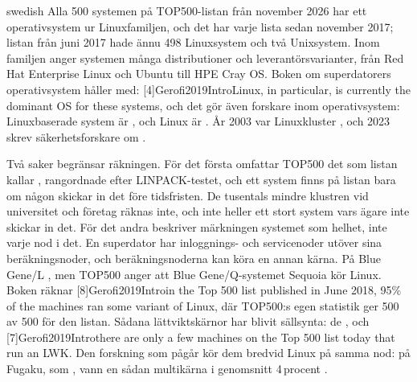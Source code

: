 \begin{onlyin}{swedish}
Alla 500 systemen på TOP500-listan från november 2026 har ett
operativsystem ur Linuxfamiljen, och det har varje lista sedan november
2017; listan från juni 2017 hade ännu 498 Linuxsystem och två
Unixsystem\autocite{Top500OSFamily2026}.  Inom familjen anger systemen
många distributioner och leverantörsvarianter, från Red Hat Enterprise
Linux och Ubuntu till HPE Cray OS\autocite{Top500OS2026}.  Boken om
superdatorers operativsystem håller med:
[4]{Gerofi2019Intro}{Linux, in particular, is
currently the dominant OS for these systems}, och det gör även forskare
inom operativsystem: Linuxbaserade system är
, och Linux är
.  År 2003 var
Linuxkluster , och 2023 skrev säkerhetsforskare om
.

Två saker begränsar räkningen.  För det första omfattar TOP500 det som
listan kallar ,
rangordnade efter LINPACK-testet\autocite{Top500Introduction2026}, och
ett system finns på listan bara om någon skickar in det före
tidsfristen\autocite{Top500Participation2026}.  De tusentals mindre
klustren vid universitet och företag räknas inte, och inte heller ett
stort system vars ägare inte skickar in det.  För det andra beskriver
märkningen systemet som helhet, inte varje nod i det.  En superdator har
inloggnings- och servicenoder utöver sina
beräkningsnoder\autocite[4]{Gerofi2019Intro}, och beräkningsnoderna kan
köra en annan kärna.  På Blue Gene/L
, men TOP500 anger att Blue
Gene/Q-systemet Sequoia kör Linux\autocite{Top500Sequoia2026}.  Boken
räknar [8]{Gerofi2019Intro}{in the Top 500
list published in June 2018, 95\% of the machines ran some variant of
Linux}, där TOP500:s egen statistik ger 500 av 500 för den
listan\autocite{Top500OSFamily2026}.  Sådana lättviktskärnor har blivit
sällsynta: de , och [7]{Gerofi2019Intro}{there are
only a few machines on the Top 500 list today that run an LWK}.  Den
forskning som pågår kör dem bredvid Linux på samma nod: på Fugaku, som
, vann en sådan multikärna i genomsnitt 4\,procent%
\autocite{Gerofi2021McKernel}.
\end{onlyin}

